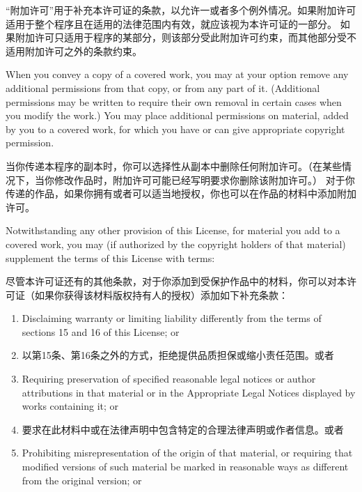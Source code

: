 \documentclass[11pt]{article}
\begin{document}
\begin{enumerate}
        “附加许可”用于补充本许可证的条款，以允许一或者多个例外情况。如果附加许可适用于整个程序且在适用的法律范围内有效，就应该视为本许可证的一部分。
        如果附加许可只适用于程序的某部分，则该部分受此附加许可约束，而其他部分受不适用附加许可之外的条款约束。

        When you convey a copy of a covered work, you may at your option
        remove any additional permissions from that copy, or from any part of
        it.  (Additional permissions may be written to require their own
        removal in certain cases when you modify the work.)  You may place
        additional permissions on material, added by you to a covered work,
        for which you have or can give appropriate copyright permission.

        当你传递本程序的副本时，你可以选择性从副本中删除任何附加许可。（在某些情况下，当你修改作品时，附加许可可能已经写明要求你删除该附加许可。）
        对于你传递的作品，如果你拥有或者可以适当地授权，你也可以在作品的材料中添加附加许可。

        Notwithstanding any other provision of this License, for material you
        add to a covered work, you may (if authorized by the copyright holders of
        that material) supplement the terms of this License with terms:

        尽管本许可证还有的其他条款，对于你添加到受保护作品中的材料，你可以对本许可证（如果你获得该材料版权持有人的授权）添加如下补充条款：

        \begin{enumerate}
          \item Disclaiming warranty or limiting liability differently from the
                terms of sections 15 and 16 of this License; or

          \item 以第15条、第16条之外的方式，拒绝提供品质担保或缩小责任范围。或者

          \item Requiring preservation of specified reasonable legal notices or
                author attributions in that material or in the Appropriate Legal
                Notices displayed by works containing it; or

          \item 要求在此材料中或在法律声明中包含特定的合理法律声明或作者信息。或者

          \item Prohibiting misrepresentation of the origin of that material, or
                requiring that modified versions of such material be marked in
                reasonable ways as different from the original version; or


\end{enumerate}
\end{enumerate}
\end{document}
